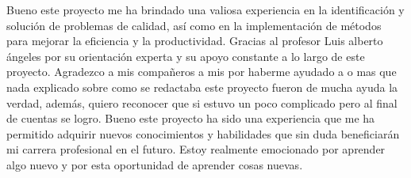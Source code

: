     Bueno este proyecto me ha brindado una valiosa experiencia en la identificación y solución de problemas de calidad, así como en la implementación de métodos para mejorar la eficiencia y la productividad.
    Gracias al profesor Luis alberto ángeles por su orientación experta y su apoyo constante a lo largo de este proyecto.
    Agradezco a mis compañeros a mis por haberme ayudado a 
    o mas que nada explicado sobre como se redactaba este proyecto fueron de mucha ayuda la verdad, además, quiero reconocer que si estuvo un poco complicado pero al final de cuentas se logro. Bueno este proyecto ha sido una experiencia que me ha permitido adquirir nuevos conocimientos y habilidades que sin duda beneficiarán mi carrera profesional en el futuro. Estoy realmente emocionado por aprender algo nuevo y por esta oportunidad de aprender cosas nuevas.
    
    
    
